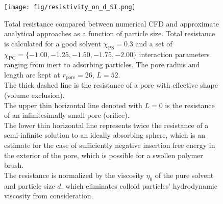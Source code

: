 \documentclass[10pt, a4paper]{article}
\begin{document}
\begin{multicols}{2}
\begin{figure}[H]
    \centering
    \texttt{[image: fig/resistivity\_on\_d\_SI.png]}
    \caption{
        Total resistance compared between numerical CFD and approximate analytical approaches as a function of particle size.
        Total resistance is calculated for a good solvent $\chi_{\textrm{PS}} = 0.3$ and a set of $\chi_{\textrm{PC}} = \{-1.00, -1.25, -1.50, -1.75, -2.00\}$ interaction parameters ranging from inert to adsorbing particles.
        The pore radius and length are kept at $r_{\textrm{pore}} = 26$, $L = 52$.
        \\
        The thick dashed line is the resistance of a pore with effective shape (volume exclusion).
        \\
        The upper thin horizontal line denoted with $L = 0$ is the resistance of an infinitesimally small pore (orifice).
        \\
        The lower thin horizontal line represents twice the resistance of a semi-infinite solution to an ideally absorbing sphere, which is an estimate for the case of sufficiently negative insertion free energy in the exterior of the pore, which is possible for a swollen polymer brush.
        \\
        The resistance is normalized by the viscosity $\eta_{0}$ of the pure solvent and particle size $d$, which eliminates colloid particles' hydrodynamic viscosity from consideration.
        }
    \label{fig:CFD_comparison}
\end{figure}


\end{multicols}
\end{document}
